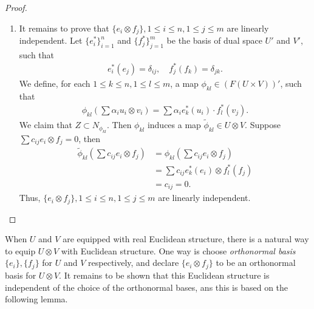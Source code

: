 \documentclass[10pt]{book}
\theoremstyle{definition}
\numberwithin{equation}{chapter}
\begin{document}
\begin{subappendices}
\begin{proof}
\begin{enumerate}[label=(\alph*)]
    \item It remains to prove that $\{e_i \otimes f_j\}, 1 \leq i \leq n, 1 \leq j \leq m$ are linearly independent. Let $\{e_i^*\}^n_{i=1}$ and $\{f_j^*\}^m_{j=1}$ be the basis of dual space $U'$ and $V'$, such that 
    \begin{align*}
        e_i^*(e_j) = \delta_{ij}, \quad f_j^*(f_k) = \delta_{jk}.
    \end{align*}
    We define, for each $1 \leq k \leq n, 1 \leq l \leq m$, a map $\phi_{kl} \in (F(U \times V))'$, such that
    \begin{align*}
        \phi_{kl} \left(\sum \alpha_{i} u_i \otimes v_i \right) = \sum \alpha_i e_k^*(u_i) \cdot f_l^*(v_j).
    \end{align*}
    We claim that $Z \subset N_{\phi_{kl}}$. Then $\phi_{kl}$ induces a map $\widetilde{\phi}_{kl} \in U \otimes V$. Suppose $\sum c_{ij} e_i \otimes f_j = 0$, then
    \begin{align*}
        \widetilde{\phi}_{kl} \left(\sum c_{ij} e_i \otimes f_j \right) & = \phi_{kl} \left(\sum c_{ij} e_i \otimes f_j \right) \\
        & =\sum c_{ij} e_k^*(e_i) \otimes f_l^*(f_j) \\
        & = c_{ij} = 0.
    \end{align*}
    Thus, $\{e_i \otimes f_j\}, 1 \leq i \leq n, 1 \leq j \leq m$ are linearly independent.
\end{enumerate}
\end{proof}

\medskip

When $U$ and $V$ are equipped with real Euclidean structure, there is a natural way to equip $U \otimes V$ with Euclidean structure. One way is choose {\em orthonormal basis} $\{e_i\}, \{f_j\}$  for $U$ and $V$ respectively, and declare $\{e_i \otimes f_j\}$ to be an orthonormal basis for $U \otimes V$.  It remains to be shown that this Euclidean structure is independent of the choice of the orthonormal bases, ans this is based on the following lemma.

\medskip


\end{subappendices}
\end{document}

